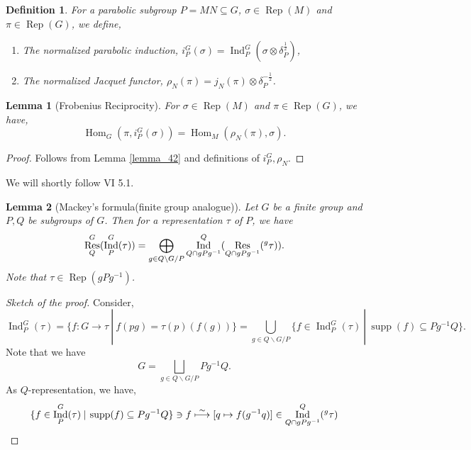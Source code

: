 \documentclass[8pt]{article}
\newtheorem{definition}{Definition}[section]
\newtheorem{lemma}{Lemma}[section]
\DeclareMathOperator{\Ind}{Ind}
\DeclareMathOperator{\Rep}{Rep}
\DeclareMathOperator{\Hom}{Hom}
\DeclareMathOperator{\supp}{supp}
\DeclareMathOperator{\Res}{Res}
\newcommand{\sep}[0]{\:|\:}
\begin{document}
\begin{definition}
  For a parabolic subgroup $P=MN\subseteq G$, $\sigma\in\Rep(M)$ and $\pi\in\Rep(G)$, we define,
  \begin{enumerate}[1).]
    \item The normalized parabolic induction, $i_P^G(\sigma) = \Ind_P^G(\sigma\otimes\delta_P^{{\frac 1 2}})$,
    \item The normalized Jacquet functor, $\rho_N(\pi) = j_N(\pi)\otimes \delta_P^{-{\frac 1 2}}$. 
  \end{enumerate}
\end{definition}
\begin{lemma}[Frobenius Reciprocity]
  \label{lemma_80}
  For $\sigma\in\Rep(M)$ and $\pi\in\Rep(G)$, we have,
  \begin{equation*}
    \Hom_G(\pi,i_P^G(\sigma)) = \Hom_M(\rho_N(\pi),\sigma).
  \end{equation*}
\end{lemma}
\begin{proof}
  Follows from Lemma \ref{lemma_42} and definitions of $i_P^G,\rho_N$.
\end{proof}
We will shortly follow \cite{Renard} VI 5.1.
\begin{lemma}[Mackey's formula(finite group analogue)]
  Let $G$ be a finite group and $P,Q$ be subgroups of $G$. Then for a representation $\tau$ of $P$, we have
  \begin{equation*}
    \Res_Q^G(\Ind_P^G(\tau)) = \bigoplus_{g\in Q\backslash  G/P}\Ind_{Q\cap gPg^{-1}}^Q(\Res_{Q\cap gPg^{-1}}(\prescript{g}{}{\tau})).
  \end{equation*}
  Note that $\tau\in\Rep(gPg^{-1})$.
\end{lemma}
\begin{proof}[Sketch of the proof]
  Consider,
  \begin{equation*}
    \Ind_P^G(\tau) = \{f:G\to\tau\sep f(pg) = \tau(p)(f(g))\} = \bigcup_{g\in Q\backslash G/P}\{f\in\Ind_P^G(\tau)\sep\supp(f)\subseteq Pg^{-1}Q\}.
  \end{equation*}
  Note that we have 
  \begin{equation*}
    G = \bigsqcup_{g\in Q\backslash G/ P}Pg^{-1}Q.
  \end{equation*}
  As $Q$-representation, we have,
  \begin{equation*}
    \{f\in\Ind_P^G(\tau)\sep \supp(f)\subseteq Pg^{-1}Q\} \ni f\stackrel{\sim}{\longmapsto}[q\mapsto f(g^{-1}q)]\in \Ind_{Q\cap gPg^{-1}}^Q(\prescript{g}{}{\tau})
  \end{equation*}
\end{proof}
\end{document}
